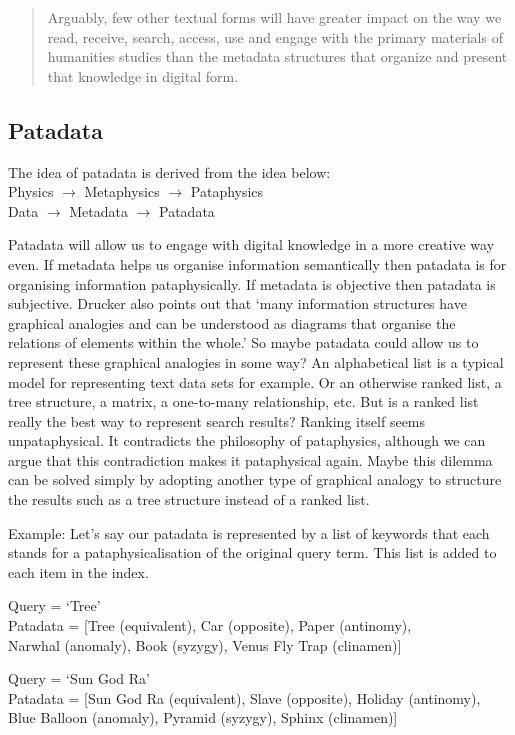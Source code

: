 \begin{quotation}
  Arguably, few other textual forms will have greater impact on the way we read, receive, search, access, use and engage with the primary materials of humanities studies than the metadata structures that organize and present that knowledge in digital form. 
\end{quotation}


\subsection*{Patadata}

The idea of patadata is derived from the idea below:\\
Physics $\to$ Metaphysics $\to$ Pataphysics\\
Data $\to$ Metadata $\to$ Patadata

Patadata will allow us to engage with digital knowledge in a more creative way even. If metadata helps us organise information semantically then patadata is for organising information pataphysically. If metadata is objective then patadata is subjective. Drucker also points out that `many information structures have graphical analogies and can be understood as diagrams that organise the relations of elements within the whole.' \autocite[p.16]{Drucker2009} So maybe patadata could allow us to represent these graphical analogies in some way? An alphabetical list is a typical model for representing text data sets for example. Or an otherwise ranked list, a tree structure, a matrix, a one-to-many relationship, etc. But is a ranked list really the best way to represent search results? Ranking itself seems unpataphysical. It contradicts the philosophy of pataphysics, although we can argue that this contradiction makes it pataphysical again. Maybe this dilemma can be solved simply by adopting another type of graphical analogy to structure the results such as a tree structure instead of a ranked list.

Example: Let's say our patadata is represented by a list of keywords that each stands for a pataphysicalisation of the original query term. This list is added to each item in the index.

Query      = `Tree'\\
Patadata = [Tree (equivalent),  Car (opposite), Paper (antinomy),\\ Narwhal (anomaly), Book (syzygy), Venus Fly Trap (clinamen)]

Query      = `Sun God Ra'\\
Patadata = [Sun God Ra (equivalent), Slave (opposite), Holiday (antinomy),\\ Blue Balloon (anomaly), Pyramid (syzygy), Sphinx (clinamen)]


